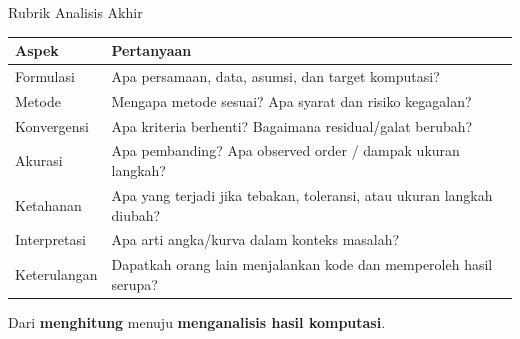 \documentclass[slides,english,noindex,lean,nobackpage,nocopyright,noupdate,nosummary]{enacom}
\begin{document}
\begin{frame}{Rubrik Analisis Akhir}
\scriptsize
\begin{tabularx}{\textwidth}{p{} X}
\hline
\textbf{Aspek} & \textbf{Pertanyaan}\\\hline
Formulasi & Apa persamaan, data, asumsi, dan target komputasi?\\
Metode & Mengapa metode sesuai? Apa syarat dan risiko kegagalan?\\
Konvergensi & Apa kriteria berhenti? Bagaimana residual/galat berubah?\\
Akurasi & Apa pembanding? Apa observed order / dampak ukuran langkah?\\
Ketahanan & Apa yang terjadi jika tebakan, toleransi, atau ukuran langkah diubah?\\
Interpretasi & Apa arti angka/kurva dalam konteks masalah?\\
Keterulangan & Dapatkah orang lain menjalankan kode dan memperoleh hasil serupa?\\\hline
\end{tabularx}
\vfill
\begin{center}\Large Dari \textbf{menghitung} menuju \textbf{menganalisis hasil komputasi}.\end{center}
\end{frame}
\end{document}
